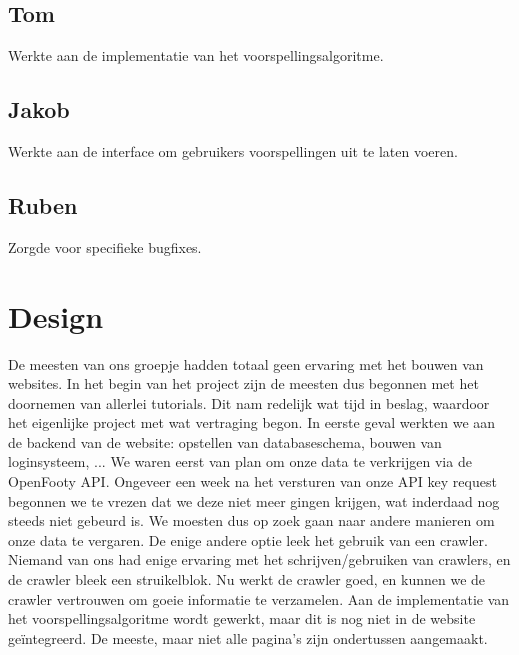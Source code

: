 \documentclass[11pt, a4paper]{article}
\begin{document}
\subsection{Tom}
Werkte aan de implementatie van het voorspellingsalgoritme.
\subsection{Jakob}
Werkte aan de interface om gebruikers voorspellingen uit te laten voeren.
\subsection{Ruben}
Zorgde voor specifieke bugfixes.	

\section{Design}
De meesten van ons groepje hadden totaal geen ervaring met het bouwen van websites. In het begin van het project zijn de meesten dus begonnen met het doornemen van allerlei tutorials. Dit nam redelijk wat tijd in beslag, waardoor het eigenlijke project met wat vertraging begon. In eerste geval werkten we aan de backend van de website: opstellen van databaseschema, bouwen van loginsysteem, ... We waren eerst van plan om onze data te verkrijgen via de OpenFooty API. Ongeveer een week na het versturen van onze API key request begonnen we te vrezen dat we deze niet meer gingen krijgen, wat inderdaad nog steeds niet gebeurd is. We moesten dus op zoek gaan naar andere manieren om onze data te vergaren. De enige andere optie leek het gebruik van een crawler. Niemand van ons had enige ervaring met het schrijven/gebruiken van crawlers, en de crawler bleek een struikelblok. Nu werkt de crawler goed, en kunnen we de crawler vertrouwen om goeie informatie te verzamelen. Aan de implementatie van het voorspellingsalgoritme wordt gewerkt, maar dit is nog niet in de website ge\"integreerd. De meeste, maar niet alle pagina's zijn ondertussen aangemaakt.
\end{document}
